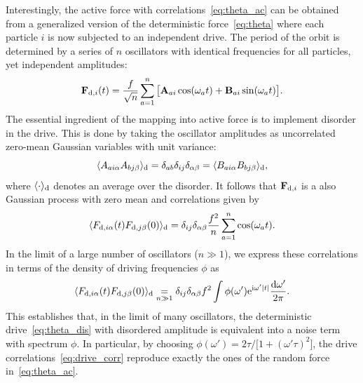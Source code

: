 \documentclass[superscriptaddress, twocolumn, prx, longbibliography, nofootinbib]{revtex4-1}
\newcommand{\dd}{\text{d}}
\newcommand{\ee}{\text{e}}
\newcommand{\ii}{\text{i}}
\begin{document}
Interestingly, the active force with correlations~\eqref{eq:theta_ac} can be obtained from a generalized version of the deterministic force~\eqref{eq:theta} where each particle $i$ is now subjected to an independent drive. The period of the orbit is determined by a series of $n$ oscillators with identical frequencies for all particles, yet independent amplitudes:
\begin{equation}\label{eq:theta_dis}
	{\bf F}_{{\rm d}, i}(t) = \frac{f}{\sqrt{n}} \sum_{a=1}^n \big[ {\bf A}_{ai} \cos(\omega_a t) + {\bf B}_{ai} \sin(\omega_a t) \big] .
\end{equation}
The essential ingredient of the mapping into active force is to implement disorder in the drive. This is done by taking the oscillator amplitudes as uncorrelated zero-mean Gaussian variables with unit variance:
\begin{equation}
	\langle A_{ai\alpha}A_{bj\beta}\rangle_{\rm d} = \delta_{ab}\delta_{ij}\delta_{\alpha\beta} = \langle B_{ai\alpha}B_{bj\beta}\rangle_{\rm d} ,
\end{equation}
where $\langle\cdot\rangle_{\rm d}$ denotes an average over the disorder. It follows that ${\bf F}_{{\rm d},i}$ is a also Gaussian process with zero mean and correlations given by
\begin{equation}
	\langle F_{{\rm d},i\alpha} (t) F_{{\rm d},j\beta}(0) \rangle_{\rm d} = \delta_{ij} \delta_{\alpha\beta} \frac{f^2}{n} \sum_{a=1}^n \cos (\omega_a t) .
\end{equation}
In the limit of a large number of oscillators ($n\gg1$), we express these correlations in terms of the density of driving frequencies $\phi$ as
\begin{equation}\label{eq:drive_corr}
	\langle F_{{\rm d},i\alpha} (t) F_{{\rm d},j\beta}(0) \rangle_\text{d} \underset{n\gg1}{=} \delta_{ij} \delta_{\alpha\beta} f^2 \int \phi(\omega') \ee^{\ii\omega'|t|} \frac{\dd\omega'}{2\pi} .
\end{equation}
This establishes that, in the limit of many oscillators, the deterministic drive~\eqref{eq:theta_dis} with disordered amplitude is equivalent into a noise term with spectrum $\phi$. In particular, by choosing $\phi(\omega') = 2\tau/ \big[1+(\omega'\tau)^2\big]$, the drive correlations~\eqref{eq:drive_corr} reproduce exactly the ones of the random force in~\eqref{eq:theta_ac}.
\end{document}
